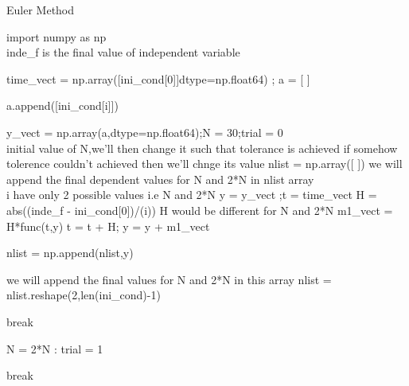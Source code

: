 \documentclass[12pt]{article}
\begin{document}
\begin{algorithm}
  \caption{Euler Method}
  \begin{algorithmic}
\State import numpy as np
\\
  \Comment inde\_f is the final value of independent variable
  
   \State time\_vect = np.array([ini\_cond[0]]dtype=np.float64) ; a = [ ] 
    
   \State a.append([ini\_cond[i]])
   \EndFor
   
    \State y\_vect = np.array(a,dtype=np.float64);N = 30;trial = 0\\
    \Comment initial value of N,we'll then change it such that tolerance is achieved
     \Comment if somehow tolerence couldn't achieved then we'll chnge its value
     \State nlist = np.array([ ])       
      \Comment we will append the final dependent values for N and 2*N in nlist array\\
       \Comment i have only 2 possible values i.e N and 2*N
        \State y = y\_vect ;t = time\_vect
              \State  H = abs((inde\_f - ini\_cond[0])/(i))   
              \Comment H would be different for N and 2*N
             \State m1\_vect = H*func(t,y)
              \State t = t + H; y = y + m1\_vect 
               \EndFor
                          
           \State nlist = np.append(nlist,y)
           
           \Comment we will append the final values for N and 2*N in this array
           \EndFor
            \State nlist = nlist.reshape(2,len(ini\_cond)-1)         
           
       
            
            \State break
          
            \State N = 2*N
        \Else :
            \State trial = 1
            
           \State break
       
         \EndIf
         \EndWhile
         
    \end{algorithmic}
\end{algorithm}
\end{document}
